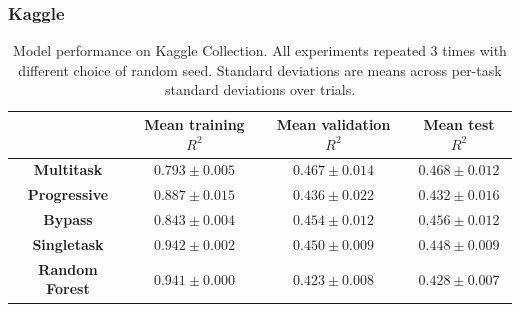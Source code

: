 \subsubsection{Kaggle}

\begin{table}[h]
    \centering
    \begin{tabular}{ |c|c|c|c| } 
    \hline
    & Mean training $R^2$ & Mean validation $R^2$ & Mean test $R^2$ \\
    \hline
    \textbf{Multitask} & $0.793 \pm 0.005$ & $0.467 \pm 0.014$ & $0.468 \pm 0.012$  \\
    \hline
    \textbf{Progressive} & $0.887 \pm 0.015$ & $0.436 \pm 0.022$ & $0.432 \pm 0.016$  \\
    \hline
    \textbf{Bypass} & $0.843 \pm 0.004$ & $0.454 \pm 0.012$ & $0.456 \pm 0.012$  \\
    \hline
    \textbf{Singletask} & $0.942 \pm 0.002$ & $0.450 \pm 0.009$ &  $0.448 \pm 0.009$ \\
    \hline
    \textbf{Random Forest} & $0.941\pm 0.000$ & $0.423 \pm 0.008$ & $0.428\pm 0.007$  \\
    \hline
    \end{tabular}
    \caption{Model performance on Kaggle Collection. All experiments repeated 3 times with different choice of random seed. Standard deviations are means across per-task standard deviations over trials.}
    \label{tab:kaggle}
\end{table}

